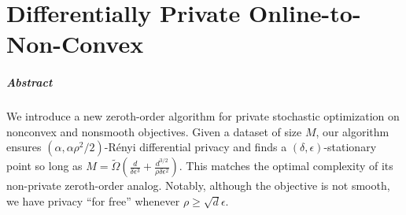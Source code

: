 \chapter{Differentially Private Online-to-Non-Convex}
\label{chapter:dp-o2nc}
\thispagestyle{myheadings}

\paragraph{Abstract}
We introduce a new zeroth-order algorithm for private stochastic optimization on nonconvex and nonsmooth objectives.
Given a dataset of size $M$, our algorithm ensures $(\alpha,\alpha\rho^2/2)$-R\'enyi differential privacy and finds a $(\delta,\epsilon)$-stationary point so long as $M=\tilde\Omega\left(\frac{d}{\delta\epsilon^3} + \frac{d^{3/2}}{\rho\delta\epsilon^2}\right)$.
This matches the optimal complexity of its non-private zeroth-order analog. 
Notably, although the objective is not smooth, we have privacy ``for free'' whenever $\rho \ge \sqrt{d}\epsilon$.







